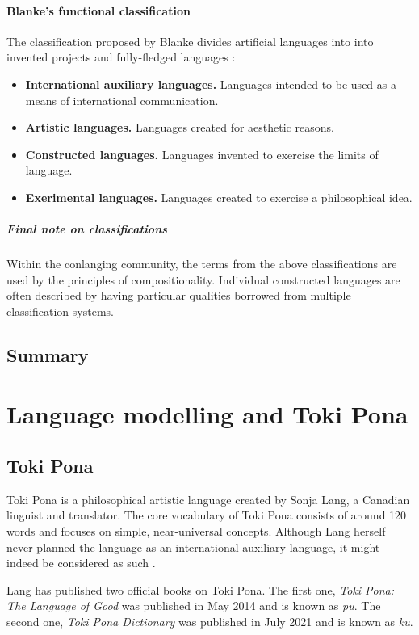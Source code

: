 \documentclass[14pt, a4paper]{extreport}
\begin{document}
      \subsubsection{Blanke's functional classification}
The classification proposed by Blanke divides artificial languages into into invented projects and fully-fledged languages \parencite{stria}:

\begin{itemize}
  \item \textbf{International auxiliary languages.} Languages intended to be used as a means of international communication.
  \item \textbf{Artistic languages.} Languages created for aesthetic reasons.
  \item \textbf{Constructed languages.} Languages invented to exercise the limits of language.
  \item \textbf{Exerimental languages.} Languages created to exercise a philosophical idea.
\end{itemize}
        \bigskip
        \paragraph{Final note on classifications}
Within the conlanging community, the terms from the above classifications are used by the principles of compositionality. Individual constructed languages are often described by having particular qualities borrowed from multiple classification systems.
    \section{Summary}


\chapter{Language modelling and Toki Pona}
  \section{Toki Pona}
Toki Pona is a philosophical artistic language created by Sonja Lang, a Canadian linguist and translator. The core vocabulary of Toki Pona consists of around 120 words and focuses on simple, near-universal concepts. Although Lang herself never planned the language as an international auxiliary language, it might indeed be considered as such \parencite[100]{stria}.

Lang has published two official books on Toki Pona. The first one, \textit{Toki Pona: The Language of Good} was published in May 2014 and is known as \textit{pu}. The second one, \textit{Toki Pona Dictionary} was published in July 2021 and is known as \textit{ku}.
\end{document}
